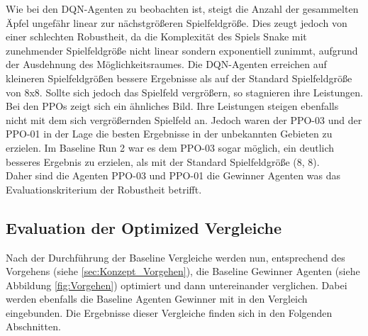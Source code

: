 Wie bei den DQN-Agenten zu beobachten ist, steigt die Anzahl der gesammelten Äpfel ungefähr linear zur nächstgrößeren Spielfeldgröße. Dies zeugt jedoch von einer schlechten Robustheit, da die Komplexität des Spiels Snake mit zunehmender Spielfeldgröße nicht linear sondern exponentiell zunimmt, aufgrund der Ausdehnung des Möglichkeitsraumes. 
Die DQN-Agenten erreichen auf kleineren Spielfeldgrößen bessere Ergebnisse als auf der Standard Spielfeldgröße von 8x8. Sollte sich jedoch das Spielfeld vergrößern, so stagnieren ihre Leistungen.
Bei den PPOs zeigt sich ein ähnliches Bild. Ihre Leistungen steigen ebenfalls nicht mit dem sich vergrößernden Spielfeld an. Jedoch waren der PPO-03 und der PPO-01 in der Lage die besten Ergebnisse in der unbekannten Gebieten zu erzielen. Im Baseline Run 2 war es dem PPO-03 sogar möglich, ein deutlich besseres Ergebnis zu erzielen, als mit der Standard Spielfeldgröße (8, 8).\\
Daher sind die Agenten PPO-03 und PPO-01 die Gewinner Agenten was das Evaluationskriterium der Robustheit betrifft.

\subsection{Evaluation der Optimized Vergleiche}
Nach der Durchführung der Baseline Vergleiche werden nun, entsprechend des Vorgehens (siehe \ref{sec:Konzept_Vorgehen}), die Baseline Gewinner Agenten (siehe Abbildung \ref{fig:Vorgehen}) optimiert und dann untereinander verglichen. Dabei werden ebenfalls die Baseline Agenten Gewinner mit in den Vergleich eingebunden. Die Ergebnisse dieser Vergleiche finden sich in den Folgenden Abschnitten.

